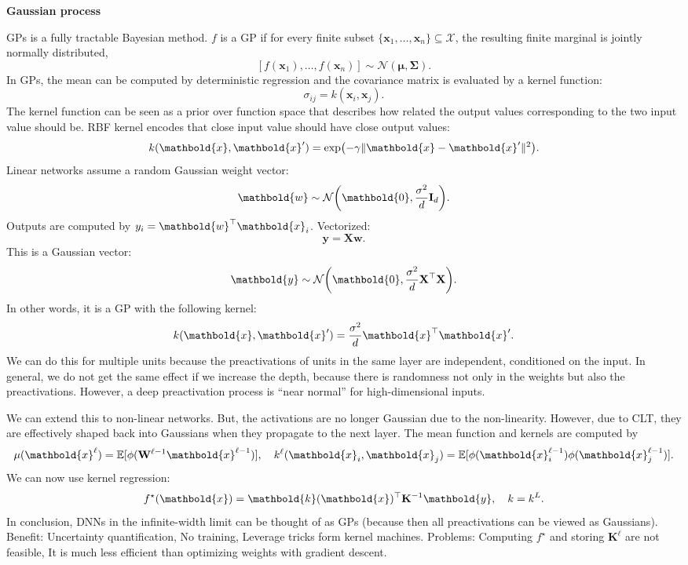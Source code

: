\documentclass[10pt]{article}
\newenvironment{topic}[1]
{\textbf{\sffamily \footnotesize \colorbox{black}{\rlap{\textbf{\textcolor{white}{#1}}}\hspace{\linewidth}\hspace{-2\fboxsep}}}}
{}
\newenvironment{subtopic}[1]
{\vspace{0.1cm} \begin{center}\textbf{\footnotesize \sffamily #1}\end{center}}
{}
\renewcommand{\mat}[1]{\ensuremath{\mathbf{#1}}}
\renewcommand{\vec}[1]{\ensuremath{\mathbold{#1}}}
\begin{document}
\begin{multicols*}{3}
\begin{topic}{Bayesian learning}
        \begin{subtopic}{Gaussian process}
            GPs is a fully tractable Bayesian method. $f$ is a GP if for every finite subset $\{ \vec{x}_1, \ldots, \vec{x}_n \} \subseteq \mathcal{X}$, the resulting finite marginal is jointly normally distributed, \[
                [f(\vec{x}_1), \ldots, f(\vec{x}_n)] \sim \mathcal{N}(\vec{\mu}, \mat{\Sigma}).
            \]
            In GPs, the mean can be computed by deterministic regression and the covariance matrix is evaluated
            by a kernel function: \[
                \sigma_{ij} = k(\vec{x}_i, \vec{x}_j).
            \]
            The kernel function can be seen as a prior over function space that describes how related the
            output values corresponding to the two input value should be. RBF kernel encodes that close input
            value should have close output values: \[
                k(\vec{x}, \vec{x}') = \exp \lft( -\gamma \| \vec{x} - \vec{x}' \|^2 \rgt).
            \]
            Linear networks assume a random Gaussian weight vector: \[
                \vec{w} \sim \mathcal{N}\lft(\vec{0}, \frac{\sigma^2}{d} \mat{I}_d\rgt).
            \]
            Outputs are computed by $y_i = \transpose{\vec{w}}\vec{x}_i$. Vectorized: \[
                \vec{y} = \mat{X} \vec{w}.
            \]
            This is a Gaussian vector: \[
                \vec{y} \sim \mathcal{N}\lft(\vec{0}, \frac{\sigma^2}{d} \transpose{\mat{X}} \mat{X} \rgt).
            \]
            In other words, it is a GP with the following kernel: \[
                k(\vec{x}, \vec{x}') = \frac{\sigma^2}{d} \transpose{\vec{x}}\vec{x}'.
            \]
            We can do this for multiple units because the preactivations of units in the same layer are
            independent, conditioned on the input. In general, we do not get the same effect if we increase the
            depth, because there is randomness not only in the weights but also the preactivations. However, a
            deep preactivation process is ``near normal'' for high-dimensional inputs.

            We can extend this to non-linear networks. But, the activations are no longer Gaussian due to the
            non-linearity. However, due to CLT, they are effectively shaped back into Gaussians when they
            propagate to the next layer. The mean function and kernels are computed by \[
                \mu(\vec{x}^{\ell}) = \E[\phi(\mat{W}^{\ell-1} \vec{x}^{\ell-1})], \quad k^{\ell}(\vec{x}_i, \vec{x}_j) = \E[\phi(\vec{x}^{\ell-1}_i) \phi(\vec{x}^{\ell-1}_j)].
            \]
            We can now use kernel regression: \[
                f^\star(\vec{x}) = \transpose{\vec{k}(\vec{x})} \mat{K}^{-1}\vec{y}, \quad k = k^L.
            \]
            In conclusion, DNNs in the infinite-width limit can be thought of as GPs (because then all
            preactivations can be viewed as Gaussians). Benefit: Uncertainty quantification, No training,
            Leverage tricks form kernel machines. Problems: Computing $f^\star$ and storing $\mat{K}^{\ell}$
            are not feasible, It is much less efficient than optimizing weights with gradient descent.


\end{subtopic}
\end{topic}
\end{multicols*}
\end{document}
